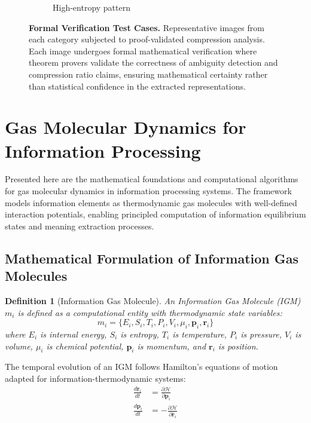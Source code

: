 \documentclass[11pt,a4paper]{article}
\newtheorem{definition}[theorem]{Definition}
\begin{document}
\begin{figure}[htbp]
\begin{subfigure}{0.45\textwidth}
\caption{High-entropy pattern}
\end{subfigure}
\caption{\textbf{Formal Verification Test Cases.} Representative images from each category subjected to proof-validated compression analysis. Each image undergoes formal mathematical verification where theorem provers validate the correctness of ambiguity detection and compression ratio claims, ensuring mathematical certainty rather than statistical confidence in the extracted representations.}
\label{fig:proof-validation-cases}
\end{figure}


\section{Gas Molecular Dynamics for Information Processing}
\label{sec:gas-molecular-dynamics}

Presented here are the mathematical foundations and computational algorithms for gas molecular dynamics in information processing systems. The framework models information elements as thermodynamic gas molecules with well-defined interaction potentials, enabling principled computation of information equilibrium states and meaning extraction processes.

\subsection{Mathematical Formulation of Information Gas Molecules}

\begin{definition}[Information Gas Molecule]
An Information Gas Molecule (IGM) $m_i$ is defined as a computational entity with thermodynamic state variables:
\begin{equation}
m_i = \{E_i, S_i, T_i, P_i, V_i, \mu_i, \mathbf{p}_i, \mathbf{r}_i\}
\label{eq:igm-definition}
\end{equation}
where $E_i$ is internal energy, $S_i$ is entropy, $T_i$ is temperature, $P_i$ is pressure, $V_i$ is volume, $\mu_i$ is chemical potential, $\mathbf{p}_i$ is momentum, and $\mathbf{r}_i$ is position.
\end{definition}

The temporal evolution of an IGM follows Hamilton's equations of motion adapted for information-thermodynamic systems:
\begin{align}
\frac{d\mathbf{r}_i}{dt} &= \frac{\partial \mathcal{H}}{\partial \mathbf{p}_i} \label{eq:position-evolution} \\
\frac{d\mathbf{p}_i}{dt} &= -\frac{\partial \mathcal{H}}{\partial \mathbf{r}_i} \label{eq:momentum-evolution}
\end{align}
\end{document}
